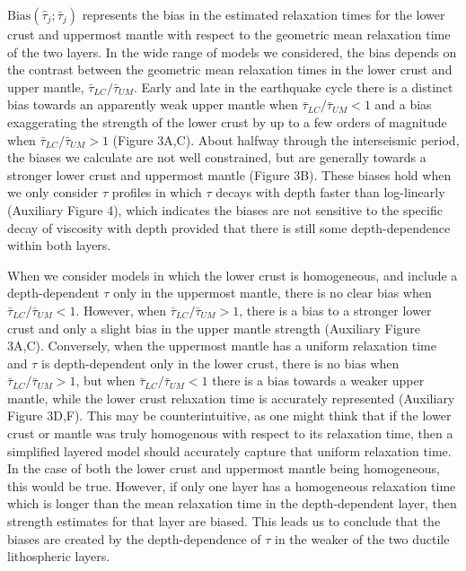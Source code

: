 $\mathrm{Bias}(\hat{\tau}_j; \bar{\tau}_j)$ represents the bias in the
estimated relaxation times for the lower crust and uppermost mantle
with respect to the geometric mean relaxation time of the two layers.
In the wide range of models we considered, the bias depends on the
contrast between the geometric mean relaxation times in the lower
crust and upper mantle, $\bar{\tau}_{LC} /\bar{\tau}_{UM}$.  Early and
late in the earthquake cycle there is a distinct bias towards an
apparently weak upper mantle when $\bar{\tau}_{LC} / \bar{\tau}_{UM} <
1$ and a bias exaggerating the strength of the lower crust by up to a
few orders of magnitude when $\bar{\tau}_{LC} / \bar{\tau}_{UM} > 1$
(Figure 3A,C).  About halfway through the interseismic period, the
biases we calculate are not well constrained, but are generally
towards a stronger lower crust and uppermost mantle (Figure 3B). These
biases hold when we only consider $\tau$ profiles in which $\tau$
decays with depth faster than log-linearly (Auxiliary Figure 4), which
indicates the biases are not sensitive to the specific decay of
viscosity with depth provided that there is still some
depth-dependence within both layers.

When we consider models in which the lower crust is homogeneous, and
include a depth-dependent $\tau$ only in the uppermost mantle, there
is no clear bias when $\bar{\tau}_{LC} / \bar{\tau}_{UM} < 1$.
However, when $\bar{\tau}_{LC} / \bar{\tau}_{UM} > 1$, there is a bias
to a stronger lower crust and only a slight bias in the upper mantle
strength (Auxiliary Figure 3A,C).  Conversely, when the uppermost
mantle has a uniform relaxation time and $\tau$ is depth-dependent
only in the lower crust, there is no bias when $\bar{\tau}_{LC} /
\bar{\tau}_{UM} > 1$, but when $\bar{\tau}_{LC} / \bar{\tau}_{UM} < 1$
there is a bias towards a weaker upper mantle, while the lower crust
relaxation time is accurately represented (Auxiliary Figure 3D,F).
This may be counterintuitive, as one might think that if the lower
crust or mantle was truly homogenous with respect to its relaxation
time, then a simplified layered model should accurately capture that
uniform relaxation time. In the case of both the lower crust and
uppermost mantle being homogeneous, this would be true. However, if
only one layer has a homogeneous relaxation time which is longer than
the mean relaxation time in the depth-dependent layer, then strength
estimates for that layer are biased.  This leads us to conclude that
the biases are created by the depth-dependence of $\tau$ in the weaker
of the two ductile lithospheric layers.

